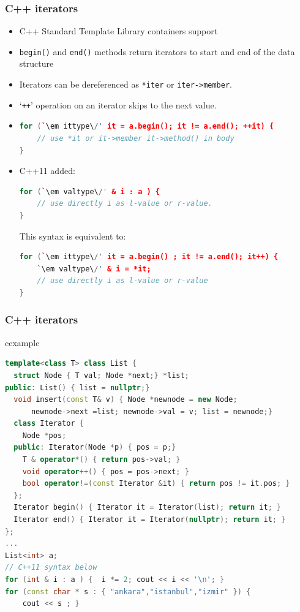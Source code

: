 \begin{frame}[fragile]
\frametitle{C++ iterators}
\begin{itemize}
\item C++ Standard Template Library containers support 
\item \lstinline!begin()! and \lstinline!end()! methods return iterators to start and end of the data structure
\item Iterators can be dereferenced as \lstinline!*iter! or \lstinline!iter->member!.
\item `\lstinline!++!' operation on an iterator skips to the next value.
\item \begin{lstlisting}[language=C++,escapeinside=`']
for (`\em ittype\/' it = a.begin(); it != a.end(); ++it) {
    // use *it or it->member it->method() in body
}
\end{lstlisting}
\item C++11 added:
\begin{lstlisting}[language=C++,escapeinside=`']
for (`\em valtype\/' & i : a ) {
    // use directly i as l-value or r-value. 
}
\end{lstlisting}
This syntax is equivalent to:
\begin{lstlisting}[language=C++,escapeinside=`']
for (`\em ittype\/' it = a.begin() ; it != a.end(); it++) {
    `\em valtype\/' & i = *it;
    // use directly i as l-value or r-value 
}
\end{lstlisting}
\end{itemize}
\end{frame}

\begin{frame}[fragile]
\frametitle{C++ iterators}
\begin{beamercolorbox}{cexample}
\begin{lstlisting}[language=C++]
template<class T> class List {
  struct Node { T val; Node *next;} *list;
public: List() { list = nullptr;}
  void insert(const T& v) { Node *newnode = new Node;
      newnode->next =list; newnode->val = v; list = newnode;}
  class Iterator {
    Node *pos;
  public: Iterator(Node *p) { pos = p;}
    T & operator*() { return pos->val; }
    void operator++() { pos = pos->next; }
    bool operator!=(const Iterator &it) { return pos != it.pos; }
  };
  Iterator begin() { Iterator it = Iterator(list); return it; }
  Iterator end() { Iterator it = Iterator(nullptr); return it; }
};
...
List<int> a;
// C++11 syntax below
for (int & i : a ) {  i *= 2; cout << i << '\n'; }
for (const char * s : { "ankara","istanbul","izmir" }) { 
    cout << s ; }
\end{lstlisting}
\end{beamercolorbox}
\end{frame}


